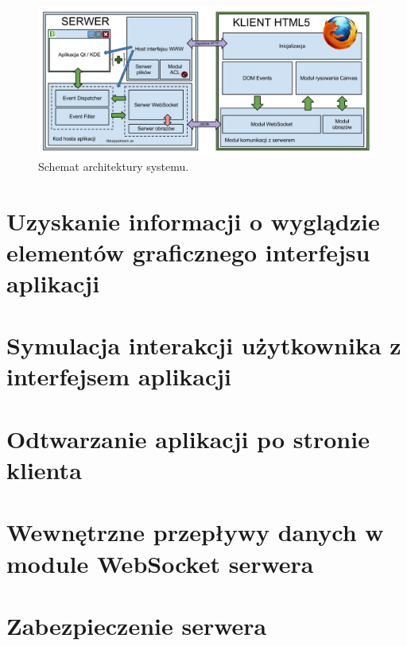 \begin{figure}[H]
\centering
\includegraphics[width=1.0\linewidth]{img/arch}
\caption{Schemat architektury systemu.}
\label{fig:arch}
\end{figure}



\section{Uzyskanie informacji o wyglądzie elementów graficznego interfejsu aplikacji}


\section{Symulacja interakcji użytkownika z interfejsem aplikacji}


\section{Odtwarzanie aplikacji po stronie klienta}


\section{Wewnętrzne przepływy danych w module WebSocket serwera}


\section{Zabezpieczenie serwera}
\label{sec:server-security}

